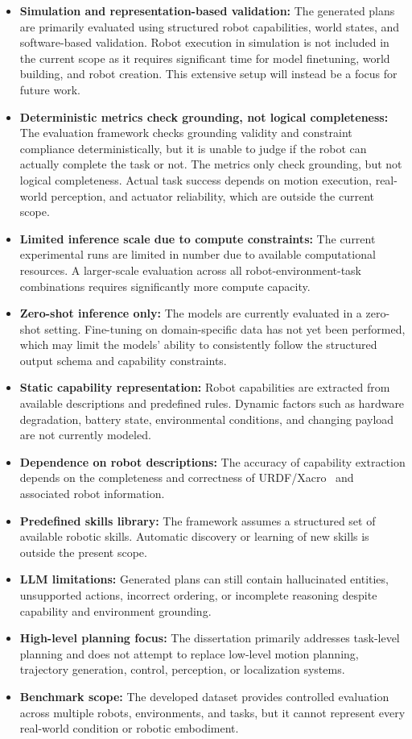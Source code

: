 \documentclass[12pt,a4paper]{article}
\begin{document}
\begin{itemize}
  \item \textbf{Simulation and representation-based validation:} The generated plans are primarily evaluated using structured robot capabilities, world states, and software-based validation. Robot execution in simulation is not included in the current scope as it requires significant time for model finetuning, world building, and robot creation. This extensive setup will instead be a focus for future work.
  \item \textbf{Deterministic metrics check grounding, not logical completeness:} The evaluation framework checks grounding validity and constraint compliance deterministically, but it is unable to judge if the robot can actually complete the task or not. The metrics only check grounding, but not logical completeness. Actual task success depends on motion execution, real-world perception, and actuator reliability, which are outside the current scope.
  \item \textbf{Limited inference scale due to compute constraints:} The current experimental runs are limited in number due to available computational resources. A larger-scale evaluation across all robot-environment-task combinations requires significantly more compute capacity.
  \item \textbf{Zero-shot inference only:} The models are currently evaluated in a zero-shot setting. Fine-tuning on domain-specific data has not yet been performed, which may limit the models' ability to consistently follow the structured output schema and capability constraints.
  \item \textbf{Static capability representation:} Robot capabilities are extracted from available descriptions and predefined rules. Dynamic factors such as hardware degradation, battery state, environmental conditions, and changing payload are not currently modeled.
  \item \textbf{Dependence on robot descriptions:} The accuracy of capability extraction depends on the completeness and correctness of URDF/Xacro~\cite{urdf} and associated robot information.
  \item \textbf{Predefined skills library:} The framework assumes a structured set of available robotic skills. Automatic discovery or learning of new skills is outside the present scope.
  \item \textbf{LLM limitations:} Generated plans can still contain hallucinated entities, unsupported actions, incorrect ordering, or incomplete reasoning despite capability and environment grounding.
  \item \textbf{High-level planning focus:} The dissertation primarily addresses task-level planning and does not attempt to replace low-level motion planning, trajectory generation, control, perception, or localization systems.
  \item \textbf{Benchmark scope:} The developed dataset provides controlled evaluation across multiple robots, environments, and tasks, but it cannot represent every real-world condition or robotic embodiment.
\end{itemize}
\end{document}
